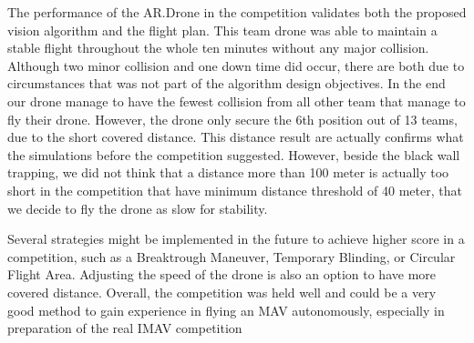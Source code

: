 The performance of the AR.Drone in the competition validates both the proposed vision algorithm and the flight plan. This team drone was able to maintain a stable flight throughout the whole ten minutes without any major collision. Although two minor collision and one down time did occur, there are both due to circumstances that was not part of the algorithm design objectives. In the end our drone manage to have the fewest collision from all other team that manage to fly their drone. However, the drone only secure the 6th position out of 13 teams, due to the short covered distance. This distance result are actually confirms what the simulations before the competition suggested. However, beside the black wall trapping, we did not think that a distance more than 100 meter is actually too short in the competition that have minimum distance threshold of 40 meter, that we decide to fly the drone as slow for stability. 

Several strategies might be implemented in the future to achieve higher score in a competition, such as a Breaktrough Maneuver, Temporary Blinding, or Circular Flight Area. Adjusting the speed of the drone is also an option to have more covered distance. Overall, the competition was held well and could be a very good method to gain experience in flying an MAV autonomously, especially in preparation of the real IMAV competition

